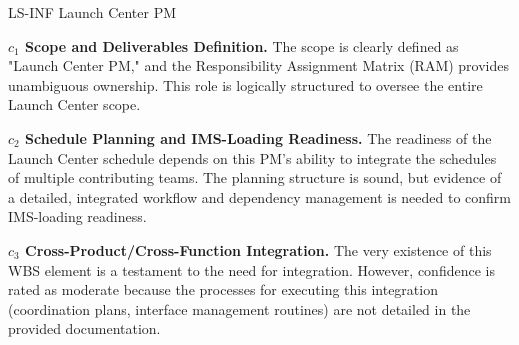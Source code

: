 \begin{frame}{LS-INF Launch Center PM}
\begin{minipage}{0.90\textwidth}
\raggedright
\fontsize{8}{9.5}\selectfont
\textbf{\(c_1\) Scope and Deliverables Definition.}
The scope is clearly defined as "Launch Center PM," and the Responsibility Assignment Matrix (RAM) provides unambiguous ownership. This role is logically structured to oversee the entire Launch Center scope.\par\vspace{0.6em}
\textbf{\(c_2\) Schedule Planning and IMS-Loading Readiness.}
The readiness of the Launch Center schedule depends on this PM's ability to integrate the schedules of multiple contributing teams. The planning structure is sound, but evidence of a detailed, integrated workflow and dependency management is needed to confirm IMS-loading readiness.\par\vspace{0.6em}
\textbf{\(c_3\) Cross-Product/Cross-Function Integration.}
The very existence of this WBS element is a testament to the need for integration. However, confidence is rated as moderate because the processes for executing this integration (coordination plans, interface management routines) are not detailed in the provided documentation.\par\vspace{0.6em}
\end{minipage}
\end{frame}

\endinput
